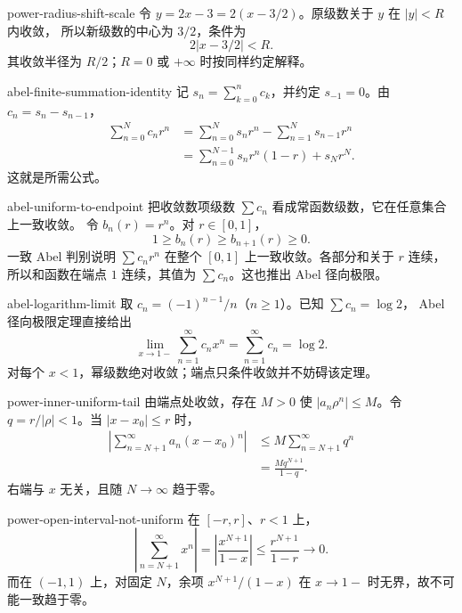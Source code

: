 \begin{solution}{power-radius-shift-scale}
令 \(y=2x-3=2(x-3/2)\)。原级数关于 \(y\) 在 \(|y|<R\) 内收敛，
所以新级数的中心为 \(3/2\)，条件为
\[
 2|x-3/2|<R.
\]
其收敛半径为 \(R/2\)；\(R=0\) 或 \(+\infty\) 时按同样约定解释。
\end{solution}

\begin{solution}{abel-finite-summation-identity}
记 \(s_n=\sum_{k=0}^nc_k\)，并约定 \(s_{-1}=0\)。由
\(c_n=s_n-s_{n-1}\)，
\[
\begin{aligned}
 \sum_{n=0}^Nc_nr^n
 &=\sum_{n=0}^Ns_nr^n-\sum_{n=1}^Ns_{n-1}r^n\\
 &=\sum_{n=0}^{N-1}s_nr^n(1-r)+s_Nr^N.
\end{aligned}
\]
这就是所需公式。
\end{solution}

\begin{solution}{abel-uniform-to-endpoint}
把收敛数项级数 \(\sum c_n\) 看成常函数级数，它在任意集合上一致收敛。
令 \(b_n(r)=r^n\)。对 \(r\in[0,1]\)，
\[
 1\ge b_n(r)\ge b_{n+1}(r)\ge0.
\]
一致 Abel 判别说明
\(\sum c_nr^n\) 在整个 \([0,1]\) 上一致收敛。各部分和关于 \(r\)
连续，所以和函数在端点 \(1\) 连续，其值为 \(\sum c_n\)。这也推出
Abel 径向极限。
\end{solution}

\begin{solution}{abel-logarithm-limit}
取 \(c_n=(-1)^{n-1}/n\)（\(n\ge1\)）。已知 \(\sum c_n=\log2\)，
Abel 径向极限定理直接给出
\[
 \lim_{x\to1-}\sum_{n=1}^\infty c_nx^n
 =\sum_{n=1}^\infty c_n=\log2.
\]
对每个 \(x<1\)，幂级数绝对收敛；端点只条件收敛并不妨碍该定理。
\end{solution}

\begin{solution}{power-inner-uniform-tail}
由端点处收敛，存在 \(M>0\) 使
\(|a_n\rho^n|\le M\)。令 \(q=r/|\rho|<1\)。当
\(|x-x_0|\le r\) 时，
\[
\begin{aligned}
 \left|\sum_{n=N+1}^\infty a_n(x-x_0)^n\right|
 &\le M\sum_{n=N+1}^\infty q^n\\
 &=\frac{Mq^{N+1}}{1-q}.
\end{aligned}
\]
右端与 \(x\) 无关，且随 \(N\to\infty\) 趋于零。
\end{solution}

\begin{solution}{power-open-interval-not-uniform}
在 \([-r,r]\)、\(r<1\) 上，
\[
 \left|\sum_{n=N+1}^\infty x^n\right|
 =\left|\frac{x^{N+1}}{1-x}\right|
 \le\frac{r^{N+1}}{1-r}\to0.
\]
而在 \((-1,1)\) 上，对固定 \(N\)，余项 \(x^{N+1}/(1-x)\) 在
\(x\to1-\) 时无界，故不可能一致趋于零。
\end{solution}

